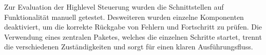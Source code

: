 Zur Evaluation der Highlevel Steuerung wurden die Schnittstellen auf Funktionalität manuell getestet. Desweiteren wurden einzelne Komponenten deaktiviert, um die korrekte Rückgabe von Fehlern und Fortschritt zu prüfen. Die Verwendung eines zentralen Paketes, welches die einzelnen Schritte startet, trennt die verschiedenen Zuständigkeiten und sorgt für einen klaren Ausführungsfluss.
